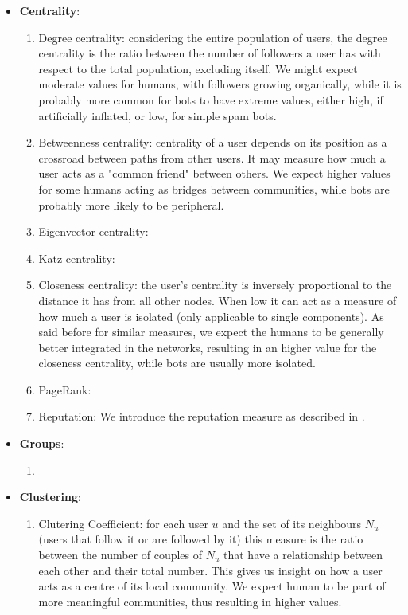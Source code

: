\documentclass[12pt, a4paper]{article}
\begin{document}
	\begin{itemize}
		\item \textbf{Centrality}:
			\begin{enumerate}
				\item Degree centrality: considering the entire population of users, the degree centrality is the ratio between the number of followers a user has with respect to the total population, excluding itself. We might expect moderate values for humans, with followers growing organically, while it is probably more common for bots to have extreme values, either high, if artificially inflated, or low, for simple spam bots.              
				\item Betweenness centrality: centrality of a user depends on its position as a crossroad between paths from other users. It may measure how much a user acts as a "common friend" between others. We expect higher values for some humans acting as bridges between communities, while bots are probably more likely to be peripheral.  
				\item Eigenvector centrality: 
                    \item Katz centrality:
                    \item Closeness centrality: the user's centrality is inversely proportional to the distance it has from all other nodes. When low it can act as a measure of how much a user is isolated (only applicable to single components). As said before for similar measures, we expect the humans to be generally better integrated in the networks, resulting in an higher value for the closeness centrality, while bots are usually more isolated. 
				\item PageRank:
				\item Reputation: We introduce the reputation measure as described in \cite{Beskow2020FriendBot}.
			\end{enumerate}
		\item \textbf{Groups}:
			\begin{enumerate}
				\item 
			\end{enumerate}
		\item \textbf{Clustering}:
			\begin{enumerate}
				\item Clutering Coefficient: for each user \(u\) and the set of its neighbours \(N_{u}\) (users that follow it or are followed by it) this measure is the ratio between the number of couples of \(N_{u}\) that have a relationship between each other and their total number. This gives us insight on how a user acts as a centre of its local community. We expect human to be part of more meaningful communities, thus resulting in higher values.

\end{enumerate}
\end{itemize}
\end{document}
